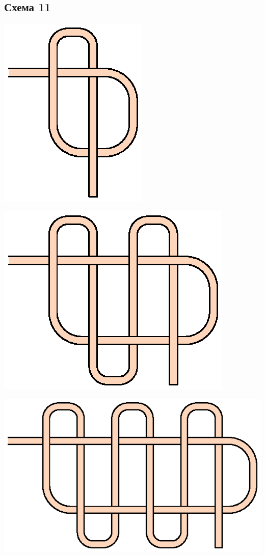 \subsection{Схема 11}
\graphicspath{{\currentpath}}

\includegraphics{images/s-11-a0.eps}

\includegraphics{images/s-11-a1.eps}

\includegraphics{images/s-11-a2.eps}

